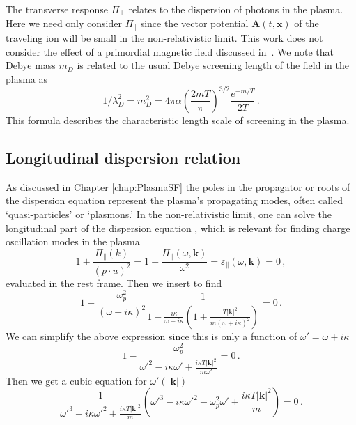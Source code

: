 The transverse response $\Pi_{\perp}$ relates to the dispersion of photons in the plasma. Here we need only consider $\Pi_\parallel$ since the vector potential $\boldsymbol{A}(t,\boldsymbol{x})$ of the traveling ion will be small in the non-relativistic limit. This work does not consider the effect of a primordial magnetic field discussed in~\cite{Steinmetz:2023abc}. We note that Debye mass $m_D$ is related to the usual Debye screening length of the field in the plasma as
\begin{equation}\label{eq:mL}
	1/\lambda_D^{2} = m_D^2= 4 \pi \alpha \left(\frac{2mT}{\pi}\right)^{3/2}\frac{e^{-m/T}}{2T}\,.
\end{equation}
This formula describes the characteristic length scale of screening in the plasma.

\subsection{Longitudinal dispersion relation}
As discussed in Chapter \ref{chap:PlasmaSF} the poles in the propagator or roots of the dispersion equation represent the plasma's propagating modes, often called `quasi-particles' or `plasmons.' In the non-relativistic limit, one can solve the longitudinal part of the dispersion equation , which is relevant for finding charge oscillation modes in the plasma
\begin{equation}
    1+ \frac{\Pi_\parallel( k)}{(p\cdot u)^2}= 1+ \frac{\Pi_\parallel(\omega, \boldsymbol{k})}{\omega^2}=\varepsilon_\parallel(\omega,\boldsymbol{k}) =0 \,,
\end{equation}
evaluated in the rest frame. Then we insert  to find
\begin{equation}
   1- \frac{\omega_p^2}{(\omega+ i \kappa)^2} \frac{1}{1-\frac{i\kappa}{\omega+ i \kappa}\left(1+\frac{T |\boldsymbol{k}|^2}{m(\omega+ i \kappa)^2} \right)}=0 \,.
\end{equation}
We can simplify the above expression since this is only a function of $\omega' =\omega+i\kappa$
\begin{equation}
   1- \frac{\omega_p^2}{\omega'^2-i\kappa\omega'+\frac{i\kappa T |\boldsymbol{k}|^2}{m \omega'} }=0 \,.
\end{equation}
Then we get a cubic equation for $\omega'(|\boldsymbol{k}|)$
\begin{equation}\label{eq:dispfact}
   \frac{1}{\omega'^3-i\kappa\omega'^2+\frac{i\kappa T |\boldsymbol{k}|^2}{m} }
    \left(\omega'^3-i\kappa\omega'^2 - \omega_p^2\omega'+\frac{i\kappa T |\boldsymbol{k}|^2}{m} \right)=0 \,.
\end{equation}
